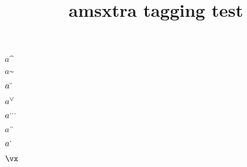 \documentclass{article}
\title{amsxtra tagging test}
\begin{document}
$a\sphat$

$a\sptilde$

$a\spbreve$

$a\spcheck$

$a\spdddot$

$a\spddot$

$a\spdot$

$\vx$
\end{document}

